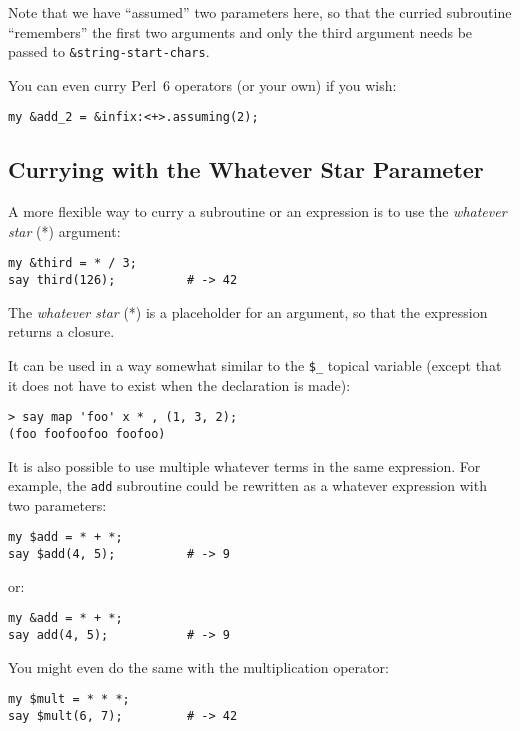 Note that we have ``assumed'' two parameters here, so 
that the curried subroutine ``remembers'' the first 
two arguments and only the third argument needs be 
passed to \verb'&string-start-chars'.

You can even curry Perl~6 operators (or your own) if 
you wish:

\begin{verbatim}
my &add_2 = &infix:<+>.assuming(2);
\end{verbatim}

\subsection{Currying with the Whatever Star Parameter}
\label{whatever star parameter}

A more flexible way to curry a subroutine or an expression 
is to use the \emph{whatever star} (*) argument:

\begin{verbatim}
my &third = * / 3; 
say third(126);          # -> 42
\end{verbatim}

The \emph{whatever star} (*) is a placeholder for 
an argument, so that the expression returns 
a closure.

It can be used in a way somewhat similar to the \verb'$_' 
topical variable (except that it does not have to exist 
when the declaration is made):

\begin{verbatim}
> say map 'foo' x * , (1, 3, 2);
(foo foofoofoo foofoo)
\end{verbatim}

It is also possible to use multiple whatever terms 
in the same expression. For example, the {\tt add} 
subroutine could be rewritten as a whatever 
expression with two parameters:

\begin{verbatim}
my $add = * + *;
say $add(4, 5);          # -> 9
\end{verbatim}

or:

\begin{verbatim}
my &add = * + *;
say add(4, 5);           # -> 9
\end{verbatim}

You might even do the same with the multiplication operator:

\begin{verbatim}
my $mult = * * *;
say $mult(6, 7);         # -> 42
\end{verbatim}

